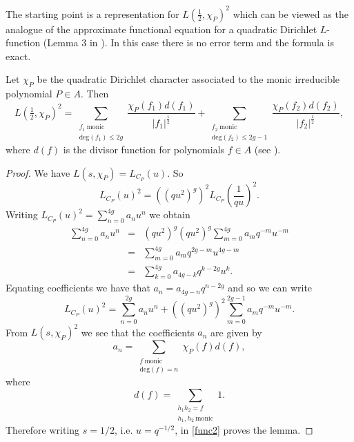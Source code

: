 \documentclass[11pt]{amsart}
\begin{document}
The starting point is a representation for $L(\tfrac{1}{2},\chi_{P})^{2}$ which can be viewed as the analogue of the approximate functional equation for a quadratic Dirichlet $L$-function (Lemma 3 in \cite{J}). In this case there is no error term and the formula is exact.

\begin{lem}
\label{funcional2}
Let $\chi_{P}$ be the quadratic Dirichlet character associated to the monic irreducible polynomial $P\in A$. Then
\begin{equation}
\label{eq4.1}
L(\tfrac{1}{2},\chi_{P})^{2}=\sum_{\substack{f_{1} \ \mathrm{monic} \\ \mathrm{deg}(f_{1})\leq2g}}\frac{\chi_{P}(f_{1})d(f_{1})}{|f_{1}|^{\tfrac{1}{2}}}+\sum_{\substack{f_{2} \ \mathrm{monic} \\ \mathrm{deg}(f_{2})\leq2g-1}}\frac{\chi_{P}(f_{2})d(f_{2})}{|f_{2}|^{\tfrac{1}{2}}},
\end{equation}
where $d(f)$ is the divisor function for polynomials $f\in A$ (see \cite[pg.15]{Ro}).
\end{lem}

\begin{proof}
We have $L(s,\chi_{P})=L_{C_{P}}(u)$. So
\begin{equation}
L_{C_{P}}(u)^{2}=((qu^{2})^{g})^{2}L_{C_{P}}\left(\frac{1}{qu}\right)^{2}.
\end{equation}
Writing $L_{C_{P}}(u)^{2}=\sum_{n=0}^{4g}a_{n}u^{n}$ we obtain
\begin{eqnarray}
\sum_{n=0}^{4g}a_{n}u^{n}&=&(qu^{2})^{g}(qu^{2})^{g}\sum_{m=0}^{4g}a_{m}q^{-m}u^{-m}\nonumber\\
&=&\sum_{m=0}^{4g}a_{m}q^{2g-m}u^{4g-m}\nonumber\\
&=&\sum_{k=0}^{4g}a_{4g-k}q^{k-2g}u^{k}.
\end{eqnarray}
Equating coefficients we have that $a_{n}=a_{4g-n}q^{n-2g}$ and so we can write
\begin{equation}
\label{func2}
L_{C_{P}}(u)^{2}=\sum_{n=0}^{2g}a_{n}u^{n}+((qu^{2})^{g})^{2}\sum_{m=0}^{2g-1}a_{m}q^{-m}u^{-m}.
\end{equation}
From $L(s,\chi_{P})^{2}$ we see that the coefficients $a_{n}$ are given by
\begin{equation}
a_{n}=\sum_{\substack{f \ \mathrm{monic} \\ \mathrm{deg}(f)=n}}\chi_{P}(f)d(f),
\end{equation}
where 
\begin{equation}
d(f)=\sum_{\substack{h_{1}h_{2}=f \\ h_{1},h_{2} \ \mathrm{monic}}}1.
\end{equation}
Therefore writing $s=1/2$, i.e. $u=q^{-1/2}$, in \eqref{func2} proves the lemma.
\end{proof}
\end{document}
